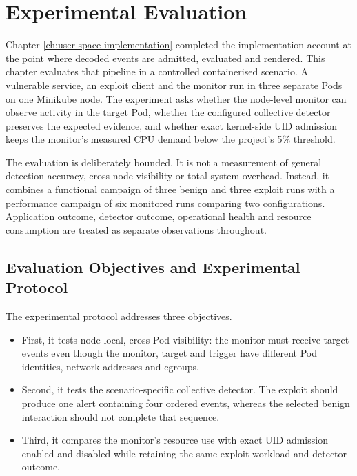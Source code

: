 \chapter{Experimental Evaluation}
\label{ch:experimental-evaluation}

Chapter \ref{ch:user-space-implementation} completed the implementation account at the point where decoded
events are admitted, evaluated and rendered. This chapter evaluates that
pipeline in a controlled containerised scenario. A vulnerable service, an
exploit client and the monitor run in three separate Pods on one Minikube node.
The experiment asks whether the node-level monitor can observe activity in the
target Pod, whether the configured collective detector preserves the expected
evidence, and whether exact kernel-side UID admission keeps the monitor's
measured CPU demand below the project's 5\% threshold.

The evaluation is deliberately bounded. It is not a measurement of general
detection accuracy, cross-node visibility or total system overhead. Instead,
it combines a functional campaign of three benign and three exploit runs with
a performance campaign of six monitored runs comparing two configurations. Application
outcome, detector outcome, operational health and resource consumption are
treated as separate observations throughout.

\section{Evaluation Objectives and Experimental Protocol}
\label{sec:evaluation-objectives-protocol}

The experimental protocol addresses three objectives.

\begin{itemize}
    \item First, it tests node-local, cross-Pod visibility: the monitor must receive target events even though the monitor, target and trigger have different Pod identities, network addresses and cgroups.
    \item Second, it tests the scenario-specific collective detector. The exploit should produce one alert containing four ordered events, whereas the selected benign interaction should not complete that sequence.
    \item Third, it compares the monitor's resource use with exact UID admission enabled and disabled while retaining the same exploit workload and detector outcome.
\end{itemize}

